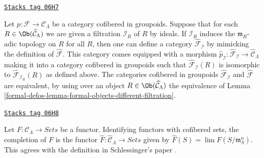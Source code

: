 \begin{remark}
\label{formal-defos-remark-different-sequence-ideals}
\href{https://stacks.math.columbia.edu/tag/06H7}{\texttt{Stacks tag 06H7}}

Let $p : \mathcal{F} \to \mathcal{C}_\Lambda$ be a category cofibered in
groupoids. Suppose that for each
$R \in \Ob(\widehat{\mathcal{C}}_\Lambda)$ we are given a filtration
$\mathcal{I}_R$ of $R$ by ideals. If
$\mathcal{I}_R$ induces the $\mathfrak m_R$-adic topology on $R$ for all $R$,
then one can define a category
$\widehat{\mathcal{F}}_\mathcal{I}$ by mimicking
the definition of $\widehat{\mathcal{F}}$. This category comes equipped with a
morphism
$\widehat{p}_\mathcal{I} : \widehat{\mathcal{F}}_\mathcal{I} \to
\widehat{\mathcal{C}}_\Lambda$ making it into a category cofibered in
groupoids such that $\widehat{\mathcal{F}}_\mathcal{I}(R)$ is isomorphic to
$\widehat{\mathcal{F}}_{\mathcal{I}_R}(R)$ as defined above. The categories
cofibered in groupoids $\widehat{\mathcal{F}}_\mathcal{I}$ and
$\widehat{\mathcal{F}}$ are equivalent, by using over an object
$R \in \Ob(\widehat{\mathcal{C}}_\Lambda)$
the equivalence of
Lemma \ref{formal-defos-lemma-formal-objects-different-filtration}.
\end{remark}

\begin{remark}
\label{formal-defos-remark-completion-functor}
\href{https://stacks.math.columbia.edu/tag/06H8}{\texttt{Stacks tag 06H8}}

Let $F: \mathcal{C}_\Lambda \to \textit{Sets}$ be a functor.
Identifying functors with cofibered sets, the completion of $F$ is the functor
$\widehat{F} : \widehat{\mathcal{C}}_\Lambda \to \textit{Sets}$
given by $\widehat{F}(S) = \lim F(S/\mathfrak{m}_S^{n})$.  This agrees
with the definition in Schlessinger's paper \cite{Sch}.
\end{remark}

